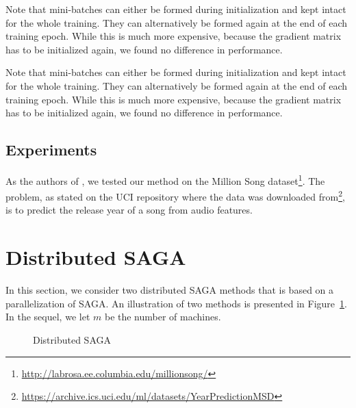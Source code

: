 \documentclass[a4paper,11pt]{article}
\begin{document}
Note that mini-batches can either be formed during initialization and kept
intact for the whole training. They can alternatively be formed again at the end
of each training epoch. While this is much more expensive, because the gradient
matrix has to be initialized again, we found no difference in performance.

Note that mini-batches can either be formed during initialization and kept
intact for the whole training. They can alternatively be formed again at the end
of each training epoch. While this is much more expensive, because the gradient
matrix has to be initialized again, we found no difference in performance.

\subsection{Experiments}

As the authors of \cite{defazio_saga_2014}, we tested our method on the Million
Song dataset\footnote{\url{http://labrosa.ee.columbia.edu/millionsong/}}. The
problem, as stated on the UCI repository where the data was downloaded
from\footnote{\url{https://archive.ics.uci.edu/ml/datasets/YearPredictionMSD}},
is to predict the release year of a song from audio features.

\section{Distributed SAGA}

In this section, we consider two distributed SAGA methods that is based on a parallelization of SAGA. An illustration of two methods is presented in Figure~\ref{2figs-show}. In the sequel, we let $m$ be the number of machines.

\begin{figure} [h]
	\centering
	 \hspace{0pt}
	\caption{Distributed SAGA}
	\label{2figs-show}
\end{figure}
\end{document}

